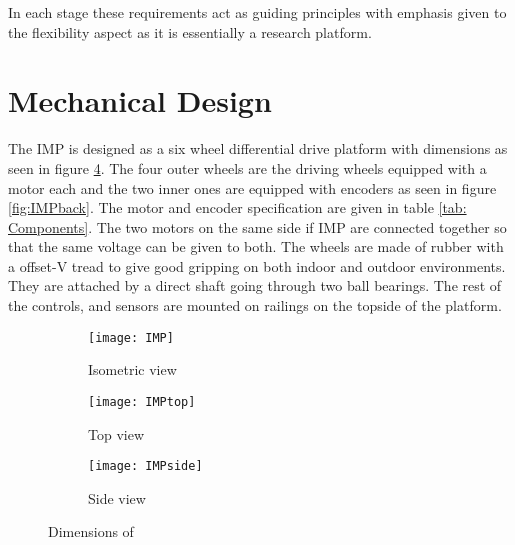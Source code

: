 In each stage these requirements act as guiding principles with emphasis given to the flexibility aspect as it is essentially a research platform.  
\section{Mechanical Design}

The IMP is designed as a six wheel differential drive platform with dimensions as seen in figure \ref{fig:IMPviews}. The four outer wheels are the driving wheels equipped with a motor each and the two inner ones are equipped with encoders as seen in figure \ref{fig:IMPback}. The motor and encoder specification are given in table \ref{tab: Components}. The two motors on the same side if IMP are connected together so that the same voltage can be given to both. The wheels are made of rubber with a offset-V tread to give good gripping on both indoor and outdoor environments. They are attached by a direct shaft going through two ball bearings. The rest of the controls, and sensors are mounted on railings on the topside of the platform. 

\begin{figure}
    \centering
    \begin{subfigure}[b]{0.3\textwidth}
	    \texttt{[image: IMP]}
	    \caption{Isometric view}
	    \label{fig:IMP}
    \end{subfigure}
    \quad %
    \begin{subfigure}[b]{0.3\textwidth}
        \texttt{[image: IMPtop]}
        \caption{Top view}
        \label{fig:IMPtop}
    \end{subfigure}%
    \quad %
    \begin{subfigure}[b]{0.3\textwidth}
        \texttt{[image: IMPside]}
        \caption{Side view}
        \label{fig:IMPside}
    \end{subfigure}%
    \caption{Dimensions of \imp}
    \label{fig:IMPviews}
\end{figure}

